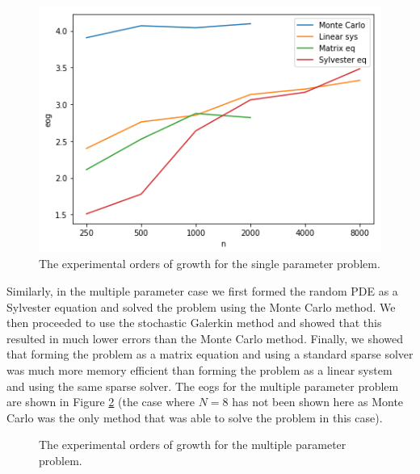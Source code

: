\documentclass[11pt]{article}
\numberwithin{equation}{section}
\begin{document}
\begin{figure}[H]
\centering
\includegraphics[scale=.5]{img/singleeog.png}
\caption{The experimental orders of growth for the single parameter problem.}
\label{fig:single eogs}
\end{figure}

Similarly, in the multiple parameter case we first formed the random PDE as a Sylvester equation and solved the problem using the Monte Carlo method. We then proceeded to use the stochastic Galerkin method and showed that this resulted in much lower errors than the Monte Carlo method. Finally, we showed that forming the problem as a matrix equation and using a standard sparse solver was much more memory efficient than forming the problem as a linear system and using the same sparse solver. The eogs for the multiple parameter problem are shown in Figure \ref{fig:multiple eogs} (the case where $N=8$ has not been shown here as Monte Carlo was the only method that was able to solve the problem in this case). 

\begin{figure}[H]
\centering
{}%
\qquad
{}%
\caption{The experimental orders of growth for the multiple parameter problem.}
\label{fig:multiple eogs}
\end{figure}
\end{document}
